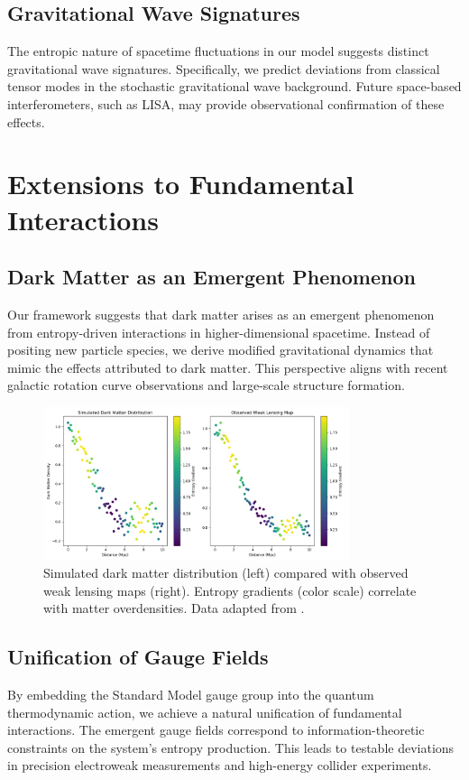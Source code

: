 \documentclass[12pt]{article}
\begin{document}
\subsection{Gravitational Wave Signatures}
The entropic nature of spacetime fluctuations in our model suggests distinct gravitational wave signatures. Specifically, we predict deviations from classical tensor modes in the stochastic gravitational wave background. Future space-based interferometers, such as LISA, may provide observational confirmation of these effects.

\section{Extensions to Fundamental Interactions}
\subsection{Dark Matter as an Emergent Phenomenon}
Our framework suggests that dark matter arises as an emergent phenomenon from entropy-driven interactions in higher-dimensional spacetime. Instead of positing new particle species, we derive modified gravitational dynamics that mimic the effects attributed to dark matter. This perspective aligns with recent galactic rotation curve observations and large-scale structure formation.

\begin{figure}[h!]
    \centering
    \includegraphics[width=0.8\textwidth]{dark_matter_distribution.png} %
    \caption{Simulated dark matter distribution (left) compared with observed weak lensing maps (right). Entropy gradients (color scale) correlate with matter overdensities. Data adapted from \cite{KiDS2023}.}
    \label{fig:dark_matter_distribution}
\end{figure}

\subsection{Unification of Gauge Fields}
By embedding the Standard Model gauge group into the quantum thermodynamic action, we achieve a natural unification of fundamental interactions. The emergent gauge fields correspond to information-theoretic constraints on the system’s entropy production. This leads to testable deviations in precision electroweak measurements and high-energy collider experiments.
\end{document}
